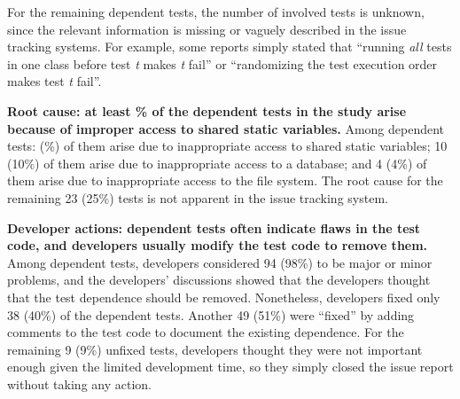 For the remaining \unum dependent tests, the number of involved tests
is unknown, since the relevant information is missing
or vaguely described in the issue tracking systems. For example,
some reports simply stated that ``running \textit{all} tests in one class before
test \emph{t} makes \emph{t} fail'' or ``randomizing the test execution order
makes test \emph{t} fail''.






\vspace{1mm}
\noindent \textbf{{Root cause: at least \svratio\% of the dependent tests
in the study arise because of improper access to shared static
variables.}} Among \dtnum dependent tests:
\svnum (\svratio\%) of them
arise due to inappropriate access to
shared static variables;
10 (10\%) of them arise
due to inappropriate access to a database; and
4 (4\%) of them arise
due to inappropriate access to the file system.
The root cause for the remaining 23 (25\%) tests is not apparent
in the issue tracking system.

\vspace{1mm}
\noindent \textbf{{Developer actions: dependent tests
often indicate flaws in the test code, and developers usually
modify the test code to remove them.}}
Among \dtnum dependent tests, developers considered 
94 (98\%) to be major or minor problems, and the 
developers' discussions showed that the developers thought that the test
dependence should be removed.
Nonetheless, developers fixed only 38 (40\%) of the \dtnum dependent tests.
Another 49 (51\%) were ``fixed'' 
by adding comments to the test code to document the existing dependence.
For the remaining 9 (9\%) unfixed tests,
developers thought they were not important enough given the limited
development time, so they simply closed the issue report without taking
any action.

